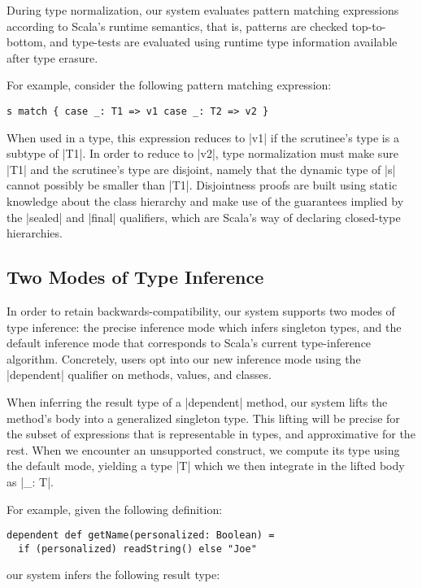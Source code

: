During type normalization, our system evaluates pattern matching expressions according to Scala's runtime semantics, that is, patterns are checked top-to-bottom, and type-tests are evaluated using runtime type information available after type erasure.

For example, consider the following pattern matching expression:

\begin{lstlisting}
s match { case _: T1 => v1 case _: T2 => v2 }
\end{lstlisting}

\noindent
When used in a type, this expression reduces to |v1| if the scrutinee's type is a subtype of |T1|.
In order to reduce to |v2|, type normalization must make sure |T1| and the scrutinee's type are disjoint, namely that the dynamic type of |s| cannot possibly be smaller than |T1|.
Disjointness proofs are built using static knowledge about the class hierarchy and make use of the guarantees implied by the |sealed| and |final| qualifiers, which are Scala's way of declaring closed-type hierarchies.

\subsection{Two Modes of Type Inference}

In order to retain backwards-compatibility, our system supports two modes of type inference: the precise inference mode which infers singleton types, and the default inference mode that corresponds to Scala's current type-inference algorithm.
Concretely, users opt into our new inference mode using the |dependent| qualifier on methods, values, and classes.

When inferring the result type of a |dependent| method, our system lifts the method's body into a generalized singleton type.
This lifting will be precise for the subset of expressions that is representable in types, and approximative for the rest.
When we encounter an unsupported construct, we compute its type using the default mode, yielding a type |T| which we then integrate in the lifted body as |_: T|.

For example, given the following definition:

\begin{lstlisting}
dependent def getName(personalized: Boolean) =
  if (personalized) readString() else "Joe"
\end{lstlisting}

\noindent
our system infers the following result type:

